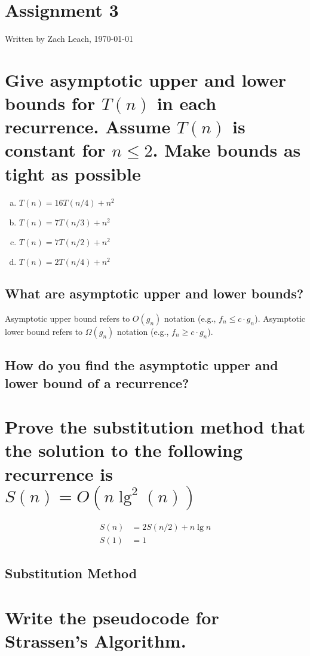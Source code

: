 
\section*{\Huge\bfseries Assignment 3}
Written by Zach Leach, \today
\section{Give asymptotic upper and lower bounds for $T(n)$ in each recurrence. Assume $T(n)$ is constant for $n \leq 2$. Make bounds as tight as possible}
\begin{enumerate}[a.]
	\item $T(n) = 16	T(n/4) + n^2$
	\item $T(n) = 7		T(n/3) + n^2$
	\item $T(n) = 7		T(n/2) + n^2$
	\item $T(n) = 2		T(n/4) + n^2$
\end{enumerate}

\subsection{What are asymptotic upper and lower bounds?}
Asymptotic upper bound refers to $O(g_n)$ notation (e.g., $f_n \leq c \cdot g_n$). Asymptotic lower bound refers to $\Omega(g_n)$ notation (e.g., $f_n \geq c \cdot g_n$).

\subsection{How do you find the asymptotic upper and lower bound of a recurrence?}

\section{Prove the substitution method that the solution to the following recurrence is $S(n) = O(n\lg^2(n))$}
\begin{align*}
	S(n) &= 2S(n/2) + n \lg n \\
	S(1) &= 1
\end{align*}
\subsection{Substitution Method}

\section{Write the pseudocode for Strassen's Algorithm.}

